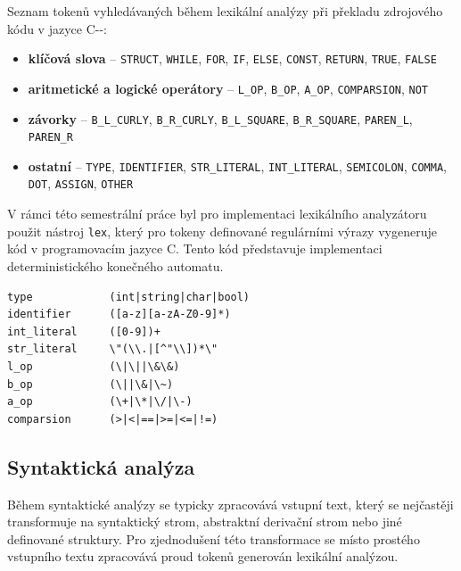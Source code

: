 \documentclass[12pt, a4paper]{article}
\begin{document}
\newpage
Seznam tokenů vyhledávaných během lexikální analýzy při překladu zdrojového kódu v jazyce C-{}-:

\begin{itemize}
    \item \textbf{klíčová slova} -- \texttt{STRUCT}, \texttt{WHILE}, \texttt{FOR}, \texttt{IF}, \texttt{ELSE}, \texttt{CONST}, \texttt{RETURN}, \texttt{TRUE}, \texttt{FALSE}

    \item \textbf{aritmetické a logické operátory} -- \texttt{L\_OP}, \texttt{B\_OP}, \texttt{A\_OP}, \texttt{COMPARSION}, \texttt{NOT}
    \item \textbf{závorky} -- \texttt{B\_L\_CURLY}, \texttt{B\_R\_CURLY}, \texttt{B\_L\_SQUARE}, \texttt{B\_R\_SQUARE}, \texttt{PAREN\_L}, \texttt{PAREN\_R}
    \item \textbf{ostatní} -- \texttt{TYPE}, \texttt{IDENTIFIER}, \texttt{STR\_LITERAL}, \texttt{INT\_LITERAL}, \texttt{SEMICOLON}, \texttt{COMMA}, \texttt{DOT}, \texttt{ASSIGN}, \texttt{OTHER}


\end{itemize}

V rámci této semestrální práce byl pro implementaci lexikálního analyzátoru použit nástroj \texttt{lex}, který pro tokeny definované regulárními výrazy vygeneruje kód v programovacím jazyce C. Tento kód představuje implementaci deterministického konečného automatu.

\begin{lstlisting}[caption={Ukázka regulárních výrazů pro skenování tokenů}, captionpos=b, style=flex]
type            (int|string|char|bool)
identifier      ([a-z][a-zA-Z0-9]*)
int_literal     ([0-9])+
str_literal     \"(\\.|[^"\\])*\"
l_op            (\|\||\&\&)
b_op            (\||\&|\~)
a_op            (\+|\*|\/|\-)
comparsion      (>|<|==|>=|<=|!=)
\end{lstlisting}

\subsection{Syntaktická analýza}

Během syntaktické analýzy se typicky zpracovává vstupní text, který se nejčastěji transformuje na syntaktický strom, abstraktní derivační strom nebo jiné definované struktury. Pro zjednodušení této transformace se místo prostého vstupního textu zpracovává proud tokenů generován lexikální analýzou.
\end{document}
